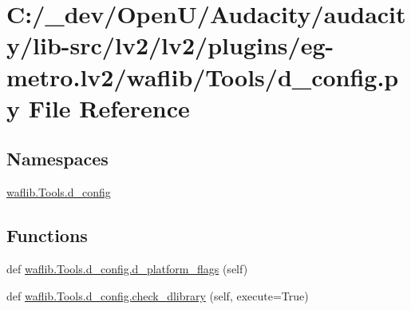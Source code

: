 \hypertarget{lv2_2plugins_2eg-metro_8lv2_2waflib_2_tools_2d__config_8py}{}\section{C\+:/\+\_\+dev/\+Open\+U/\+Audacity/audacity/lib-\/src/lv2/lv2/plugins/eg-\/metro.lv2/waflib/\+Tools/d\+\_\+config.py File Reference}
\label{lv2_2plugins_2eg-metro_8lv2_2waflib_2_tools_2d__config_8py}
\subsection*{Namespaces}
\begin{DoxyCompactItemize}
\item 
 \hyperlink{namespacewaflib_1_1_tools_1_1d__config}{waflib.\+Tools.\+d\+\_\+config}
\end{DoxyCompactItemize}
\subsection*{Functions}
\begin{DoxyCompactItemize}
\item 
def \hyperlink{namespacewaflib_1_1_tools_1_1d__config_a430d331781f08b8478d542b708c4ccf4}{waflib.\+Tools.\+d\+\_\+config.\+d\+\_\+platform\+\_\+flags} (self)
\item 
def \hyperlink{namespacewaflib_1_1_tools_1_1d__config_ae2009fc7aeda344482ce8fc8eae64f49}{waflib.\+Tools.\+d\+\_\+config.\+check\+\_\+dlibrary} (self, execute=True)
\end{DoxyCompactItemize}
